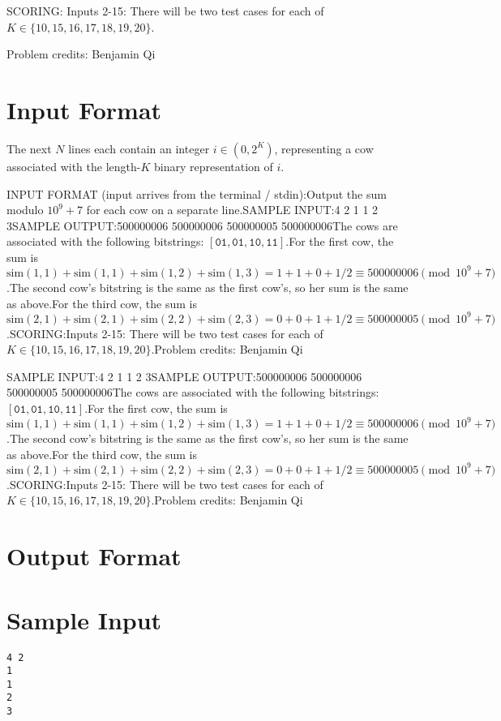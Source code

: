 \documentclass[12pt]{article}
\begin{document}
SCORING:
Inputs 2-15: There will be two test cases for each of
$K\in \{10,15,16,17,18,19,20\}$.


Problem credits: Benjamin Qi



\section*{Input Format}
The next $N$ lines each contain an integer $i\in (0,2^K)$, representing a cow
associated with the length-$K$ binary representation of $i$.

INPUT FORMAT (input arrives from the terminal / stdin):Output the sum modulo $10^9+7$ for each cow on a separate line.SAMPLE INPUT:4 2
1
1
2
3SAMPLE OUTPUT:500000006
500000006
500000005
500000006The cows are associated with the following bitstrings:
$[\texttt{01}, \texttt{01}, \texttt{10}, \texttt{11}]$.For the first cow, the sum is
$\text{sim}(1,1)+\text{sim}(1,1)+\text{sim}(1,2)+\text{sim}(1,3)=1+1+0+1/2\equiv 500000006\pmod{10^9+7}$.The second cow's bitstring is the same as the first cow's, so her sum is the
same as above.For the third cow, the sum is$\text{sim}(2,1)+\text{sim}(2,1)+\text{sim}(2,2)+\text{sim}(2,3)=0+0+1+1/2\equiv 500000005\pmod{10^9+7}$.SCORING:Inputs 2-15: There will be two test cases for each of
$K\in \{10,15,16,17,18,19,20\}$.Problem credits: Benjamin Qi

SAMPLE INPUT:4 2
1
1
2
3SAMPLE OUTPUT:500000006
500000006
500000005
500000006The cows are associated with the following bitstrings:
$[\texttt{01}, \texttt{01}, \texttt{10}, \texttt{11}]$.For the first cow, the sum is
$\text{sim}(1,1)+\text{sim}(1,1)+\text{sim}(1,2)+\text{sim}(1,3)=1+1+0+1/2\equiv 500000006\pmod{10^9+7}$.The second cow's bitstring is the same as the first cow's, so her sum is the
same as above.For the third cow, the sum is$\text{sim}(2,1)+\text{sim}(2,1)+\text{sim}(2,2)+\text{sim}(2,3)=0+0+1+1/2\equiv 500000005\pmod{10^9+7}$.SCORING:Inputs 2-15: There will be two test cases for each of
$K\in \{10,15,16,17,18,19,20\}$.Problem credits: Benjamin Qi

\section*{Output Format}


\section*{Sample Input}
\begin{verbatim}
4 2
1
1
2
3
\end{verbatim}
\end{document}
